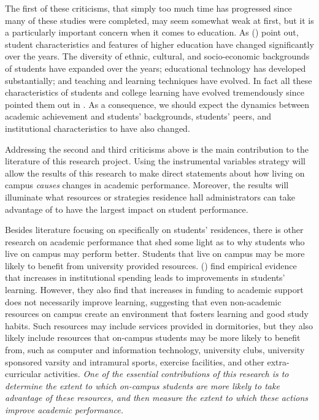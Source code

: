 \documentclass[11pt]{article}
\newcommand{\citee}[1]{\citename{#1} (\citeyear{#1})}
\begin{document}
The first of these criticisms, that simply too much time has progressed since many of these studies were completed, may seem somewhat weak at first, but it is a particularly important concern when it comes to education.  As \citee{pt1991} point out, student characteristics and features of higher education have changed significantly over the years.  The diversity of ethnic, cultural, and socio-economic backgrounds of students have expanded over the years; educational technology has developed substantially; and teaching and learning techniques have evolved.  In fact all these characteristics of students and college learning have evolved tremendously since  pointed them out in \citeyear{pt1991}.  As a consequence, we should expect the dynamics between academic achievement and students' backgrounds, students' peers, and institutional characteristics to have also changed.

Addressing the second and third criticisms above is the main contribution to the literature of this research project.  Using the instrumental variables strategy will allow the results of this research to make direct statements about how living on campus \textit{causes} changes in academic performance.  Moreover, the results will illuminate what resources or strategies residence hall administrators can take advantage of to have the largest impact on student performance. 

Besides literature focusing on specifically on students' residences, there is other research on academic performance that shed some light as to why students who live on campus may perform better.  Students that live on campus may be more likely to benefit from university provided resources.  \citee{ts2001} find empirical evidence that increases in institutional spending leads to improvements in students' learning.  However, they also find that increases in funding to academic support does not necessarily improve learning, suggesting that even non-academic resources on campus create an environment that fosters learning and good study habits.  Such resources may include services provided in dormitories, but they also likely include resources that on-campus students may be more likely to benefit from, such as computer and information technology, university clubs, university sponsored varsity and intramural sports, exercise facilities, and other extra-curricular activities.  \textit{One of the essential contributions of this research is to determine the extent to which on-campus students are more likely to take advantage of these resources, and then measure the extent to which these actions improve academic performance.}
\end{document}
